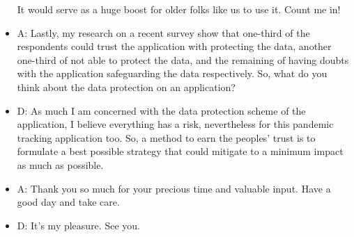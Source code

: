 \begin{appendices}
\begin{itemize}
        It would serve as a huge boost for older folks like us to use it. Count me in!
        \item A: Lastly, my research on a recent survey show that one-third of the respondents could trust the
        application with protecting the data, another one-third of not able to protect the data, and the
        remaining of having doubts with the application safeguarding the data respectively. So, what
        do you think about the data protection on an application?
        \item D: As much I am concerned with the data protection scheme of the application, I believe
        everything has a risk, nevertheless for this pandemic tracking application too. So, a method to
        earn the peoples’ trust is to formulate a best possible strategy that could mitigate to a minimum
        impact as much as possible.
        \item A: Thank you so much for your precious time and valuable input. Have a good day and take care.
        \item D: It’s my pleasure. See you.
      \end{itemize}

\end{appendices}